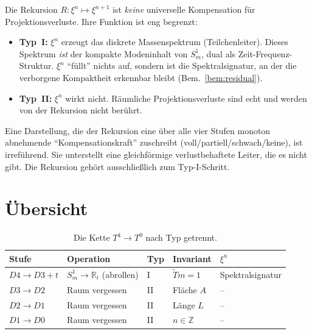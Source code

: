 Die Rekursion $R:\xi^n \mapsto \xi^{n+1}$ ist \emph{keine} universelle
Kompensation f\"ur Projektionsverluste. Ihre Funktion ist eng begrenzt:
\begin{itemize}
  \item \textbf{Typ~I:} $\xi^n$ erzeugt das diskrete Massenspektrum
  (Teilchenleiter). Dieses Spektrum \emph{ist} der kompakte Modeninhalt von
  $S^1_m$, dual als Zeit-Frequenz-Struktur. $\xi^n$ ``f\"ullt'' nichts auf,
  sondern ist die Spektralsignatur, an der die verborgene Kompaktheit erkennbar
  bleibt (Bem.~\ref{bem:residual}).
  \item \textbf{Typ~II:} $\xi^n$ wirkt nicht. R\"aumliche Projektionsverluste
  sind echt und werden von der Rekursion nicht ber\"uhrt.
\end{itemize}

\begin{remark}
Eine Darstellung, die der Rekursion eine \"uber alle vier Stufen monoton
abnehmende ``Kompensationskraft'' zuschreibt (voll/partiell/schwach/keine), ist
irref\"uhrend. Sie unterstellt eine gleichf\"ormige verlustbehaftete Leiter, die
es nicht gibt. Die Rekursion geh\"ort ausschlie\ss lich zum Typ-I-Schritt.
\end{remark}

\section{\"Ubersicht}

\begin{table}[h!]
\centering
\begin{tabular}{lllll}
\hline
\textbf{Stufe} & \textbf{Operation} & \textbf{Typ} & \textbf{Invariant} & \textbf{$\xi^n$} \\
\hline
$D4\to D3{+}t$ & $S^1_m\to\mathbb{R}_t$ (abrollen) & I & $\tilde{T}m=1$ & Spektralsignatur \\
$D3\to D2$ & Raum vergessen & II & Fl\"ache $A$ & -- \\
$D2\to D1$ & Raum vergessen & II & L\"ange $L$ & -- \\
$D1\to D0$ & Raum vergessen & II & $n\in\mathbb{Z}$ & -- \\
\hline
\end{tabular}
\caption{Die Kette $T^4 \to T^0$ nach Typ getrennt.}
\end{table}

